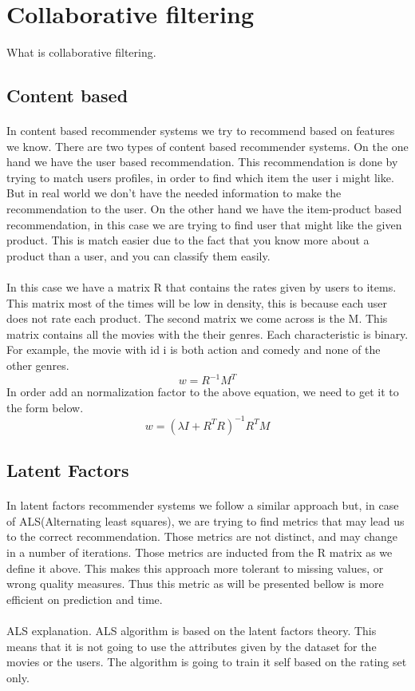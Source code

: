 \section{Collaborative filtering}
What is collaborative filtering.
\cite{RecommenderSystems:2}
\subsection{Content based}

\paragraph{}In content based recommender systems we try to recommend based on features we know. There are two types of content based recommender systems. On the one hand we have the user based recommendation. This recommendation is done by trying to match users profiles, in order to find which item the user i might like. But in real world we don't have the needed information to make the recommendation to the user. On the other hand we have the item-product based recommendation, in this case we are trying to find user that might like the given product. This is match easier due to the fact that you know more about a product than a user, and you can classify them easily.
\paragraph{}In this case we have a matrix R that contains the rates given by users to items. This matrix most of the times will be low in density, this is because each user does not rate each product. The second matrix we come across is the M. This matrix contains all the movies with the their genres. Each characteristic is binary. For example, the movie with id i is both action and comedy and none of the other genres.
\begin{equation}
 w=R^{-1}M^{T}
\end{equation}
In order add an normalization factor to the above equation, we need to get it to the form below.
\begin{equation}
 w=(\lambda I + R^{T}R)^{-1} R^{T}M 
\end{equation}

\subsection{Latent Factors}
\paragraph{} In latent factors recommender systems we follow a similar approach but, in case of ALS(Alternating least squares), we are trying to find metrics that may lead us to the correct recommendation. Those metrics are not distinct, and may change in a number of iterations. Those metrics are inducted from the R matrix as we define it above. This makes this approach more tolerant to missing values, or wrong quality measures. Thus this metric as will be presented bellow is more efficient on prediction and time.

\paragraph{} ALS explanation.
ALS algorithm is based on the latent factors theory. This means that it is not going to use the attributes given by the dataset for the movies or the users. The algorithm is going to train it self based on the rating set only.

